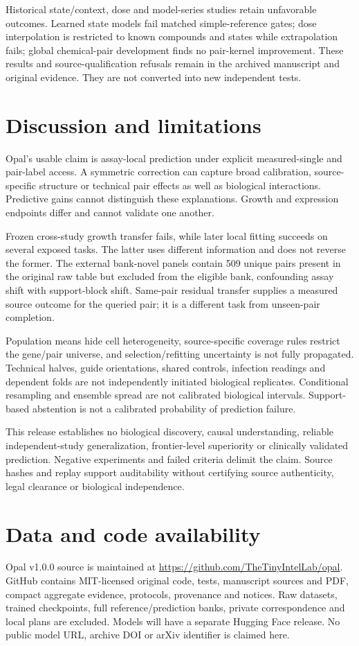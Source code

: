 \documentclass{article}
\begin{document}
Historical state/context, dose and model-series studies retain unfavorable outcomes. Learned state models fail matched simple-reference gates; dose interpolation is restricted to known compounds and states while extrapolation fails; global chemical-pair development finds no pair-kernel improvement. These results and source-qualification refusals remain in the archived manuscript and original evidence. They are not converted into new independent tests.

\section{Discussion and limitations}
Opal's usable claim is assay-local prediction under explicit measured-single and pair-label access. A symmetric correction can capture broad calibration, source-specific structure or technical pair effects as well as biological interactions. Predictive gains cannot distinguish these explanations. Growth and expression endpoints differ and cannot validate one another.

Frozen cross-study growth transfer fails, while later local fitting succeeds on several exposed tasks. The latter uses different information and does not reverse the former. The external bank-novel panels contain 509 unique pairs present in the original raw table but excluded from the eligible bank, confounding assay shift with support-block shift. Same-pair residual transfer supplies a measured source outcome for the queried pair; it is a different task from unseen-pair completion.

Population means hide cell heterogeneity, source-specific coverage rules restrict the gene/pair universe, and selection/refitting uncertainty is not fully propagated. Technical halves, guide orientations, shared controls, infection readings and dependent folds are not independently initiated biological replicates. Conditional resampling and ensemble spread are not calibrated biological intervals. Support-based abstention is not a calibrated probability of prediction failure.

This release establishes no biological discovery, causal understanding, reliable independent-study generalization, frontier-level superiority or clinically validated prediction. Negative experiments and failed criteria delimit the claim. Source hashes and replay support auditability without certifying source authenticity, legal clearance or biological independence.

\section*{Data and code availability}
Opal v1.0.0 source is maintained at \url{https://github.com/TheTinyIntelLab/opal}. GitHub contains MIT-licensed original code, tests, manuscript sources and PDF, compact aggregate evidence, protocols, provenance and notices. Raw datasets, trained checkpoints, full reference/prediction banks, private correspondence and local plans are excluded. Models will have a separate Hugging Face release. No public model URL, archive DOI or arXiv identifier is claimed here.
\end{document}
